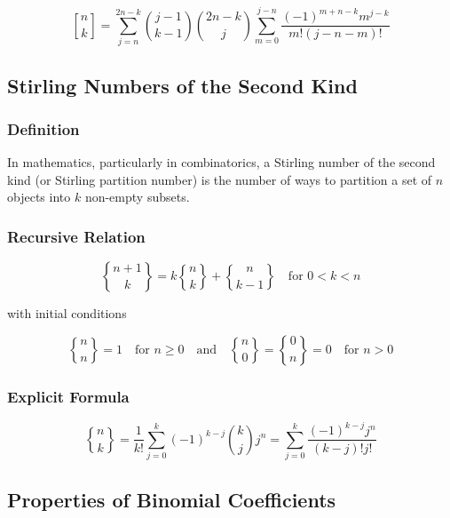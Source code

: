 \documentclass[10pt]{article}
\newcommand{\stirlingi}{\genfrac{[}{]}{0pt}{}}
\newcommand{\stirlingii}{\genfrac{\{}{\}}{0pt}{}}
\begin{document}
\begin{displaymath}
\stirlingi{n}{k} = \sum_{j = n}^{2n - k} \binom{j - 1}{k - 1} \binom{2n - k}{j} \sum_{m = 0}^{j - n} \frac{(-1)^{m + n - k} m^{j - k}}{m! (j - n - m)!}
\end{displaymath}

\subsection{Stirling Numbers of the Second Kind}

\subsubsection{Definition}

In mathematics, particularly in combinatorics, a Stirling number of the second
kind (or Stirling partition number) is the number of ways to partition a set of
$n$ objects into $k$ non-empty subsets.

\subsubsection{Recursive Relation}

\begin{displaymath}
\stirlingii{n + 1}{k} = k \stirlingii{n}{k} + \stirlingii{n}{k - 1} \quad\text{for } 0 < k < n
\end{displaymath}

with initial conditions

\begin{displaymath}
\stirlingii{n}{n} = 1 \quad\text{for } n \geq 0 \quad\text{and}\quad \stirlingii{n}{0} = \stirlingii{0}{n} = 0 \quad\text{for } n > 0
\end{displaymath}

\subsubsection{Explicit Formula}

\begin{displaymath}
\stirlingii{n}{k} = \frac{1}{k!} \sum_{j = 0}^{k} (-1)^{k - j} \binom{k}{j} j^{n} = \sum_{j = 0}^{k} \frac{(-1)^{k - j} j^{n}}{(k - j)! j!}
\end{displaymath}

\subsection{Properties of Binomial Coefficients}
\end{document}
